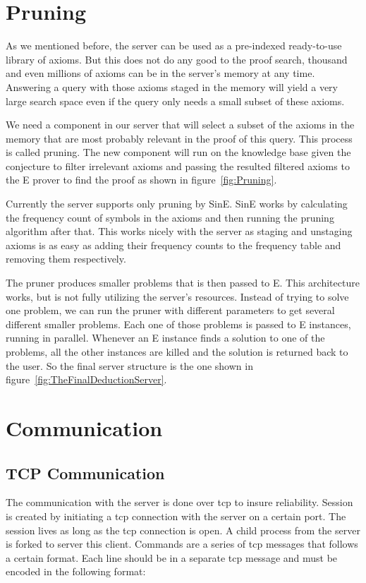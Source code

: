 \section{Pruning}
As we mentioned before, the server can be used as a pre-indexed ready-to-use library of axioms. But this does not do any good to the proof search, thousand and even millions of axioms can be in the server's memory at any time. Answering a query with those axioms staged in the memory will yield a very large search space even if the query only needs a small subset of these axioms.

We need a component in our server that will select a subset of the axioms in the memory that are most probably relevant in the proof of this query. This process is called pruning. The new component will run on the knowledge base given the conjecture to filter irrelevant axioms and passing the resulted filtered axioms to the E prover to find the proof as shown in figure~\ref{fig:Pruning}.


Currently the server supports only pruning by SinE. SinE works by calculating the frequency count of symbols in the axioms and then running the pruning algorithm after that. This works nicely with the server as staging and unstaging axioms is as easy as adding their frequency counts to the frequency table and removing them respectively.

The pruner produces smaller problems that is then passed to E. This architecture works, but is not fully utilizing the server's resources. Instead of trying to solve one problem, we can run the pruner with different parameters to get several different smaller problems. Each one of those problems is passed to E instances, running in parallel. Whenever an E instance finds a solution to one of the problems, all the other instances are killed and the solution is returned back to the user. So the final server structure is the one shown in figure~\ref{fig:TheFinalDeductionServer}.


\section{Communication}
\subsection{TCP Communication}\label{subsec:tcpCommunication}
The communication with the server is done over \ac{tcp} to insure reliability. Session is created by initiating a \ac{tcp} connection with the server on a certain port. The session lives as long as the \ac{tcp} connection is open. A child process from the server is forked to server this client. Commands are a series of \ac{tcp} messages that follows a certain format. Each line should be in a separate \ac{tcp} message and must be encoded in the following format:

